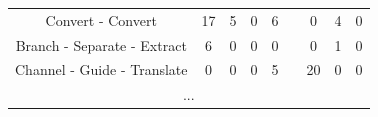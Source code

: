 \begin{table}[t]
\begin{tabular}{|c|c|c|c|c|l|c|c|c|}
Convert - Convert           & 17                                                           & 5                                                                   & 0                                                              & 6                                                       &                      & 0      & 4   & 0 \\ \cline{1-5} \cline{7-9} 
Branch - Separate - Extract & 6                                                           & 0                                                                   & 0                                                              & 0                                                       &                      & 0      & 1   & 0 \\ \cline{1-5} \cline{7-9} 
Channel - Guide - Translate & 0                                                           & 0                                                                   & 0                                                              & 5                                                       &                      & 20      & 0   & 0 \\ \cline{1-5} \cline{7-9}
\multicolumn{9}{|c|}{...}                                                                                                                                                                                                                                                                                                    \\ \hline
\end{tabular}
\end{table}


